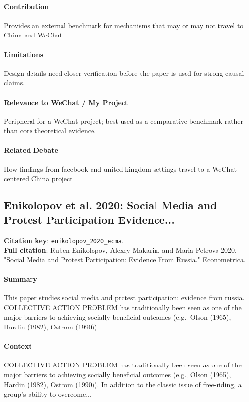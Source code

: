 \documentclass[12pt]{article}
\begin{document}
\paragraph{Contribution} Provides an external benchmark for mechanisms that may or may not travel to China and WeChat.

\paragraph{Limitations} Design details need closer verification before the paper is used for strong causal claims.

\paragraph{Relevance to WeChat / My Project} Peripheral for a WeChat project; best used as a comparative benchmark rather than core theoretical evidence.

\paragraph{Related Debate} How findings from facebook and united kingdom settings travel to a WeChat-centered China project


\subsection{Enikolopov et al. 2020: Social Media and Protest Participation Evidence...}
\textbf{Citation key}: \texttt{enikolopov\_2020\_ecma}.\\
\textbf{Full citation}: Ruben Enikolopov, Alexey Makarin, and Maria Petrova 2020. "Social Media and Protest Participation: Evidence From Russia." Econometrica.

\paragraph{Summary} This paper studies social media and protest participation: evidence from russia. COLLECTIVE ACTION PROBLEM has traditionally been seen as one of the major barriers to achieving socially beneficial outcomes (e.g., Olson (1965), Hardin (1982), Ostrom (1990)).

\paragraph{Context} COLLECTIVE ACTION PROBLEM has traditionally been seen as one of the major barriers to achieving socially beneficial outcomes (e.g., Olson (1965), Hardin (1982), Ostrom (1990)). In addition to the classic issue of free-riding, a group's ability to overcome...
\end{document}
